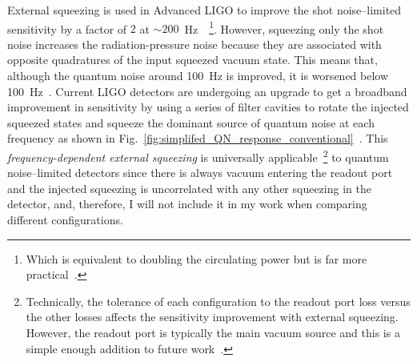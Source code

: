 External squeezing is used in Advanced LIGO to improve the shot noise--limited sensitivity by a factor of $2$ at $\sim200$~Hz~\cite{aasietal2013,tseQuantumEnhancedAdvancedLIGO2019}~\footnote{Which is equivalent to doubling the circulating power but is far more practical~\cite{}.}.
However, squeezing only the shot noise increases the radiation-pressure noise because they are associated with opposite quadratures of the input squeezed vacuum state. %
This means that, although the quantum noise around 100~Hz is improved, it is worsened below 100~Hz~\cite{aasietal2013}.
Current LIGO detectors are undergoing an upgrade to get a broadband improvement in sensitivity by using a series of filter cavities to rotate the injected squeezed states and squeeze the dominant source of quantum noise at each frequency as shown in Fig.~\ref{fig:simplifed_QN_response_conventional}~\cite{LIGOFilterCavitypaperLeeMcCulleretal}.
This \emph{frequency-dependent external squeezing} is universally applicable~\footnote{Technically, the tolerance of each configuration to the readout port loss versus the other losses affects the sensitivity improvement with external squeezing. However, the readout port is typically the main vacuum source and this is a simple enough addition to future work~\cite{}.} to quantum noise--limited detectors since there is always vacuum entering the readout port and the injected squeezing is uncorrelated with any other squeezing in the detector, and, therefore, I will not include it in my work when comparing different configurations. %


